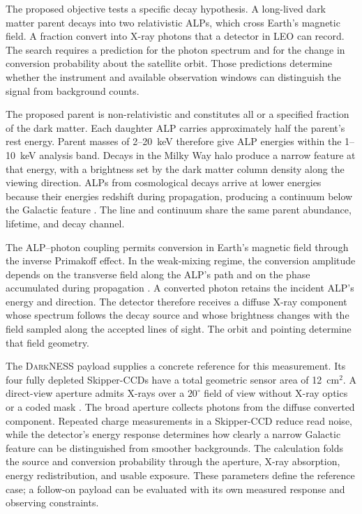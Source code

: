 \documentclass[11pt]{article}
\newcommand{\DarkNESS}{\textsc{DarkNESS}}
\begin{document}
The proposed objective tests a specific decay hypothesis. A long-lived dark matter parent decays into two relativistic ALPs, which cross Earth's magnetic field. A fraction convert into X-ray photons that a detector in LEO can record. The search requires a prediction for the photon spectrum and for the change in conversion probability about the satellite orbit. Those predictions determine whether the instrument and available observation windows can distinguish the signal from background counts.

The proposed parent is non-relativistic and constitutes all or a specified fraction of the dark matter. Each daughter ALP carries approximately half the parent's rest energy. Parent masses of 2--20~keV therefore give ALP energies within the 1--10~keV analysis band. Decays in the Milky Way halo produce a narrow feature at that energy, with a brightness set by the dark matter column density along the viewing direction. ALPs from cosmological decays arrive at lower energies because their energies redshift during propagation, producing a continuum below the Galactic feature \citep{yamamoto2020alp,dror2021cosmic,cui2022cosmogenic}. The line and continuum share the same parent abundance, lifetime, and decay channel.

The ALP--photon coupling permits conversion in Earth's magnetic field through the inverse Primakoff effect. In the weak-mixing regime, the conversion amplitude depends on the transverse field along the ALP's path and on the phase accumulated during propagation \citep{sikivie1983experimental,raffelt1988mixing}. A converted photon retains the incident ALP's energy and direction. The detector therefore receives a diffuse X-ray component whose spectrum follows the decay source and whose brightness changes with the field sampled along the accepted lines of sight. The orbit and pointing determine that field geometry.

The \DarkNESS{} payload supplies a concrete reference for this measurement. Its four fully depleted Skipper-CCDs have a total geometric sensor area of 12~cm$^2$. A direct-view aperture admits X-rays over a $20^\circ$ field of view without X-ray optics or a coded mask \citep{alpine2025darkness}. The broad aperture collects photons from the diffuse converted component. Repeated charge measurements in a Skipper-CCD reduce read noise, while the detector's energy response determines how clearly a narrow Galactic feature can be distinguished from smoother backgrounds. The calculation folds the source and conversion probability through the aperture, X-ray absorption, energy redistribution, and usable exposure. These parameters define the reference case; a follow-on payload can be evaluated with its own measured response and observing constraints.
\end{document}
